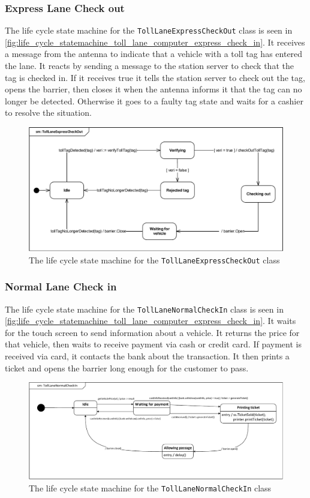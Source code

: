 \subsubsection*{Express Lane Check out}
The life cycle state machine for the \texttt{TollLaneExpressCheckOut} class is seen in \autoref{fig:life_cycle_statemachine_toll_lane_computer_express_check_in}. It receives a message from the antenna to indicate that a vehicle with a toll tag has entered the lane. It reacts by sending a message to the station server to check that the tag is checked in. If it receives true it tells the station server to check out the tag, opens the barrier, then closes it when the antenna informs it that the tag can no longer be detected.  Otherwise it goes to a faulty tag state and waits for a cashier to resolve the situation. 
\begin{figure}[H]
\centering
\includegraphics[width=0.7\linewidth]{img/behaviour_state_machines/life_cycle_state_machines/life_cycle_statemachine_toll_lane_computer_express_check_out}
\caption{The life cycle state machine for the \texttt{TollLaneExpressCheckOut} class}
\label{fig:life_cycle_statemachine_toll_lane_computer_express_check_out}
\end{figure}

\subsubsection*{Normal Lane Check in}
The life cycle state machine for the \texttt{TollLaneNormalCheckIn} class is seen in \autoref{fig:life_cycle_statemachine_toll_lane_computer_express_check_in}. It waits for the touch screen to send information about a vehicle. It returns the price for that vehicle, then waits to receive payment via cash or credit card. If payment is received via card, it contacts the bank about the transaction. It then prints a ticket and opens the barrier long enough for the customer to pass.
\begin{figure}[H]
\centering
\includegraphics[width=0.7\linewidth]{img/behaviour_state_machines/life_cycle_state_machines/life_cycle_state_machine_toll_lane_computer}
\caption{The life cycle state machine for the \texttt{TollLaneNormalCheckIn} class}
\label{fig:life_cycle_state_machine_toll_lane_computer}
\end{figure}

